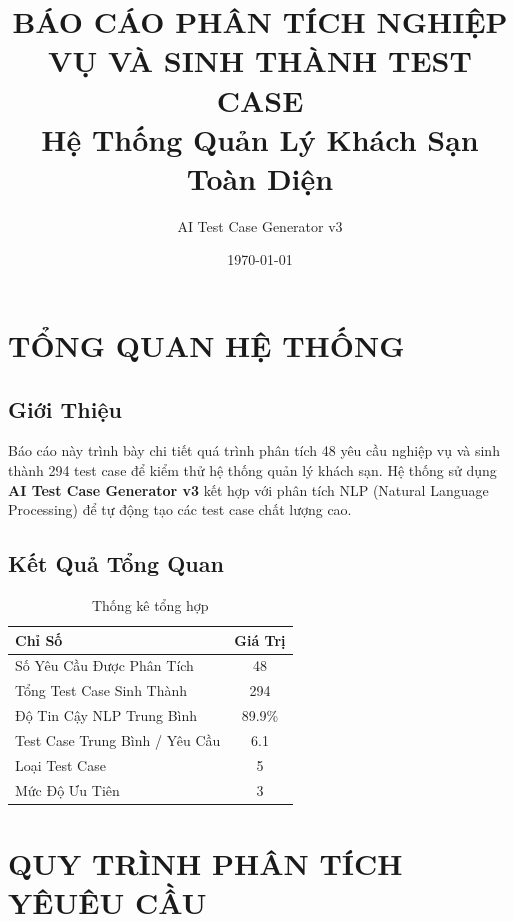 \documentclass[12pt, a4paper]{article}
\title{\textbf{BÁO CÁO PHÂN TÍCH NGHIỆP VỤ VÀ SINH THÀNH TEST CASE}\\
\large{Hệ Thống Quản Lý Khách Sạn Toàn Diện}}
\author{AI Test Case Generator v3}
\date{\today}
\begin{document}
\maketitle

\tableofcontents
\newpage

\section{TỔNG QUAN HỆ THỐNG}

\subsection{Giới Thiệu}

Báo cáo này trình bày chi tiết quá trình phân tích 48 yêu cầu nghiệp vụ và sinh thành 294 test case để kiểm thử hệ thống quản lý khách sạn. Hệ thống sử dụng \textbf{AI Test Case Generator v3} kết hợp với phân tích NLP (Natural Language Processing) để tự động tạo các test case chất lượng cao.

\subsection{Kết Quả Tổng Quan}

\begin{table}[h]
\centering
\begin{tabular}{|l|c|}
\hline
\textbf{Chỉ Số} & \textbf{Giá Trị} \\
\hline
Số Yêu Cầu Được Phân Tích & 48 \\
Tổng Test Case Sinh Thành & 294 \\
Độ Tin Cậy NLP Trung Bình & 89.9\% \\
Test Case Trung Bình / Yêu Cầu & 6.1 \\
Loại Test Case & 5 \\
Mức Độ Ưu Tiên & 3 \\
\hline
\end{tabular}
\caption{Thống kê tổng hợp}
\end{table}

\newpage

\section{QUY TRÌNH PHÂN TÍCH YÊUÊU CẦU}
\end{document}
